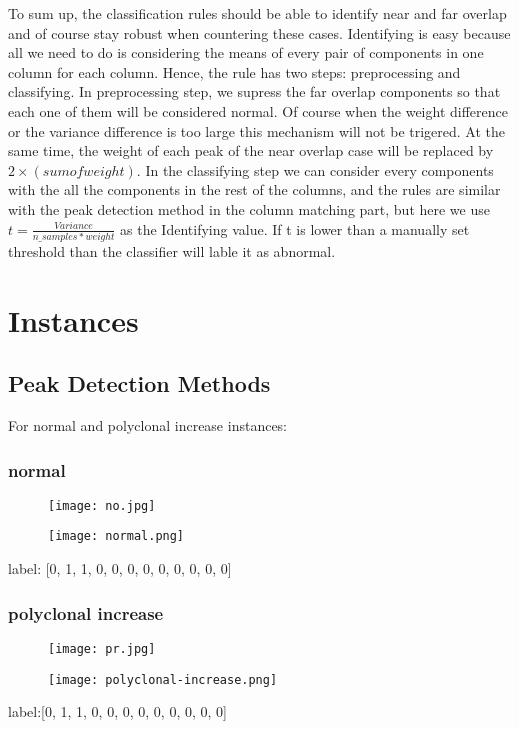 \documentclass[12pt]{ctexart}
\begin{document}
\par To sum up, the classification rules should be able to identify near and far overlap and of course stay robust when countering these cases. Identifying is easy because all we need to do is considering the means of every pair of components in one column for each column. Hence, the rule has two steps: preprocessing and classifying. In preprocessing step, we supress the far overlap components so that each one of them will be considered normal. Of course when the weight difference or the variance difference is too large this mechanism will not be trigered. At the same time, the weight of each peak of the near overlap case will be replaced by $2\times(sum of weight)$. In the classifying step we can consider every components with the all the components in the rest of the columns, and the rules are similar with the peak detection method in the column matching part, but here we use $t=\frac{Variance}{n\_samples*weight}$ as the Identifying value. If t is lower than a manually set threshold than the classifier will lable it as abnormal.
\section{Instances}
\subsection{Peak Detection Methods}
For normal and polyclonal increase instances:
\subsubsection{normal}
\begin{figure}[H]
    \centering
    \texttt{[image: no.jpg]}
\end{figure}
\begin{figure}[H]
    \centering
    \texttt{[image: normal.png]}
\end{figure}
label: [0, 1, 1, 0, 0, 0, 0, 0, 0, 0, 0, 0]
\subsubsection{polyclonal increase}
\begin{figure}[H]
    \centering
    \texttt{[image: pr.jpg]}
\end{figure}
\begin{figure}[H]
    \centering
    \texttt{[image: polyclonal-increase.png]}
\end{figure}
label:[0, 1, 1, 0, 0, 0, 0, 0, 0, 0, 0, 0]
\end{document}
